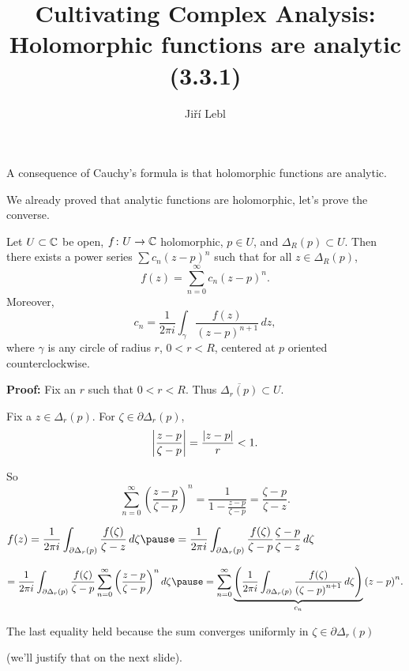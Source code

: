 \documentclass[10pt,aspectratio=169]{beamer}
\author{Ji\v{r}\'i Lebl}
\institute[OSU]{%
Departemento pri Matematiko de Oklahoma {\^S}tata Universitato}
\title{Cultivating Complex Analysis:\\%
Holomorphic functions are analytic (3.3.1)}
\date{}
\begin{document}
\begin{frame}
\titlepage
\end{frame}

\begin{frame}
A consequence of Cauchy's formula is
that holomorphic functions are analytic.

\medskip
\pause

We already proved
that analytic functions are holomorphic, let's prove the converse.

\pause

\begin{theorem} \label{thm:holpower}
Let $U \subset {\mathbb{C}}$ be open, $f \colon U \to {\mathbb{C}}$
holomorphic, $p \in U$, and $\Delta_R(p) \subset U$.
\pause
Then there exists a power series $\sum c_n {(z-p)}^n$
such that for all $z \in \Delta_R(p)$,
\begin{equation*}
f(z) = \sum_{n=0}^\infty c_n {(z-p)}^n .
\end{equation*}
\pause
Moreover,
\begin{equation*}
c_n = 
\frac{1}{2\pi i}
\int_{\gamma}
\frac{f(z)}{{(z-p)}^{n+1}}
\,
dz  ,
\end{equation*}
where $\gamma$ is any circle of radius $r$, $0 < r < R$, centered at
$p$ oriented counterclockwise.
\end{theorem}

\end{frame}

\begin{frame}

\textbf{Proof:}
Fix an $r$ such that $0 < r < R$.
\pause
Thus $\overline{\Delta_r(p)} \subset U$.

\pause
\medskip

Fix a $z \in \Delta_r(p)$.
\pause
For $\zeta \in \partial \Delta_r(p)$, 
\[
\left\lvert {\frac{z-p}{\zeta-p}} \right\rvert =
\frac{\lvert {z-p} \rvert}{r} < 1 .
\]

\pause

So
\[
\sum_{n=0}^\infty
{\left(\frac{z-p}{\zeta-p}\right)}^n
=
\frac{1}{1-\frac{z-p}{\zeta-p}}
=
\frac{\zeta-p}{\zeta-z} .
\]

\pause
\medskip

$\displaystyle
f(z)
=
\frac{1}{2\pi i}
\int_{\partial \Delta_r(p)}
\frac{f(\zeta)}{\zeta-z}
\,
d \zeta 
\pause
=
\frac{1}{2\pi i}
\int_{\partial \Delta_r(p)}
\frac{f(\zeta)}{\zeta-p}
\frac{\zeta-p}{\zeta-z}
\,
d \zeta 
$

\medskip
\pause

\hspace*{0.5in}$\displaystyle
=
\frac{1}{2\pi i}
\int_{\partial \Delta_r(p)}
\frac{f(\zeta)}{\zeta-p}
\sum_{n=0}^\infty
{\left(\frac{z-p}{\zeta-p}\right)}^n
\,
d \zeta 
\pause
=
\sum_{n=0}^\infty
\underbrace{
\left(
\frac{1}{2\pi i}
\int_{\partial \Delta_r(p)}
\frac{f(\zeta)}{{(\zeta-p)}^{n+1}}
\,
d \zeta 
\right)
}_{c_n}
{(z-p)}^n .
$

The last equality held because the sum converges uniformly in 
$\zeta \in \partial \Delta_r(p)$

(we'll justify that on the next slide).

\end{frame}
\end{document}
